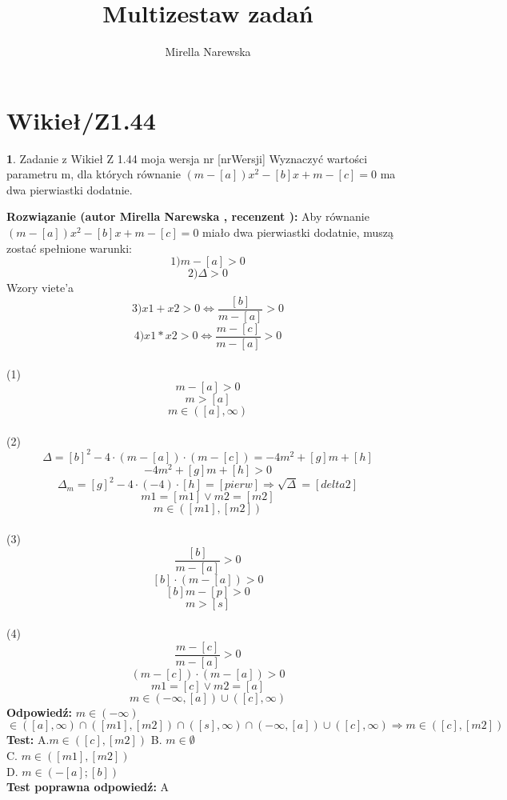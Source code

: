 \documentclass[12pt, a4paper]{article}
\title{Multizestaw zadań}
\author{Mirella Narewska}
\date{}
\theoremstyle{definition} %
\newtheorem{zad}{}
\newcommand{\kategoria}[1]{\section{#1}} %
\newcommand{\zadStart}[1]{\begin{zad}#1\newline} %
\newcommand{\zadStop}{\end{zad}}   %
\newcommand{\rozwStart}[2]{\noindent \textbf{Rozwiązanie (autor #1 , recenzent #2): }\newline} %
\newcommand{\odpStart}{\noindent \textbf{Odpowiedź:}\newline}    %
\newcommand{\odpStop}{\newline}                                             %
\newcommand{\testStart}{\noindent \textbf{Test:}\newline} %
\newcommand{\testStop}{\newline} %
\newcommand{\kluczStart}{\noindent \textbf{Test poprawna odpowiedź:}\newline} %
\newcommand{\kluczStop}{\newline} %
\begin{document}
\maketitle


\kategoria{Wikieł/Z1.44}
\zadStart{Zadanie z Wikieł Z 1.44 moja wersja nr [nrWersji]}
Wyznaczyć wartości parametru m, dla których równanie $(m-[a])x^2-[b]x+m-[c]=0$ ma dwa pierwiastki dodatnie.
\zadStop
\rozwStart{Mirella Narewska}{}
Aby równanie $(m-[a])x^2-[b]x+m-[c]=0$ miało dwa pierwiastki dodatnie, muszą zostać spełnione warunki:
$$1) m-[a]>0$$
$$2)\Delta>0$$
Wzory viete'a
$$3) x1+x2>0 \Leftrightarrow \frac{[b]}{m-[a]}>0$$
$$4) x1*x2>0 \Leftrightarrow \frac{m-[c]}{m-[a]}>0$$
\\
(1)
\\
$$m-[a]>0$$
$$m>[a]$$
$$m \in ([a],\infty)$$
\\
(2)
\\
$$\Delta=[b]^2-4\cdot(m-[a])\cdot(m-[c])=-4m^2+[g]m+[h]$$
$$-4m^2+[g]m+[h]>0$$
$$\Delta_m=[g]^2-4\cdot(-4)\cdot[h]=[pierw] \Rightarrow \sqrt{\Delta}=[delta2]$$
$$m1=[m1] \vee m2=[m2]$$
$$m \in ([m1],[m2])$$
\\
(3)
$$\frac{[b]}{m-[a]}>0$$
$$[b]\cdot(m-[a])>0$$
$$[b]m-[p]>0$$
$$m>[s]$$
\\
(4)
$$\frac{m-[c]}{m-[a]}>0$$
$$(m-[c])\cdot(m-[a])>0$$
$$m1=[c] \vee m2=[a]$$
$$m \in (-\infty,[a]) \cup ([c],\infty)$$
\odpStart
$m \in (-\infty)$
$$\in ([a],\infty) \cap ([m1],[m2]) \cap ([s],\infty) \cap (-\infty,[a]) \cup ([c],\infty) \Rightarrow m \in ([c],[m2])$$
\odpStop
\testStart
A.$m \in ([c],[m2])$
B. $m \in \emptyset$ \\
C. $m \in ([m1],[m2])$ \\
D. $m \in (-[a];[b])$ \\
\testStop
\kluczStart
A
\kluczStop
\end{document}
